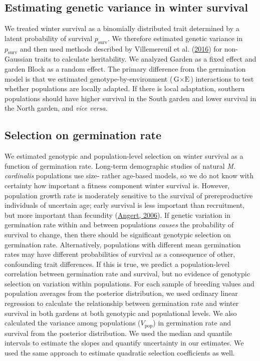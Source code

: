 \documentclass[
  12pt,
]{article}
\begin{document}
\hypertarget{estimating-genetic-variance-in-winter-survival}{%
\subsection{Estimating genetic variance in winter survival}\label{estimating-genetic-variance-in-winter-survival}}

We treated winter survival as a binomially distributed trait determined by a latent probability of survival \(p_\text{surv}\). We therefore estimated genetic variance in \(p_\text{surv}\) and then used methods described by Villemereuil et al. (\protect\hyperlink{ref-de_villemereuil_general_2016}{2016}) for non-Gaussian traits to calculate heritability. We analyzed Garden as a fixed effect and garden Block as a random effect. The primary difference from the germination model is that we estimated genotype-by-environment (\(\text{G}\times\text{E}\)) interactions to test whether populations are locally adapted. If there is local adaptation, southern populations should have higher survival in the South garden and lower survival in the North garden, and \emph{vice versa}.

\hypertarget{selection-on-germination-rate}{%
\subsection{Selection on germination rate}\label{selection-on-germination-rate}}

We estimated genotypic and population-level selection on winter survival as a function of germination rate. Long-term demographic studies of natural \emph{M. cardinalis} populations use size- rather age-based models, so we do not know with certainty how important a fitness component winter survival is. However, population growth rate is moderately sensitive to the survival of prereproductive individuals of uncertain age; early survival is less important than recruitment, but more important than fecundity (\protect\hyperlink{ref-angert_demography_2006}{Angert, 2006}). If genetic variation in germination rate within and between populations \emph{causes} the probability of survival to change, then there should be significant genotypic selection on germination rate. Alternatively, populations with different mean germination rates may have different probabilities of survival as a consequence of other, confounding trait differences. If this is true, we predict a population-level correlation between germination rate and survival, but no evidence of genotypic selection on variation within populations. For each sample of breeding values and population averages from the posterior distribution, we used ordinary linear regression to calculate the relationship between germination rate and winter survival in both gardens at both genotypic and populational levels. We also calculated the variance among populations (\(V_\text{pop}\)) in germination rate and survival from the posterior distribution. We used the median and quantile intervals to estimate the slopes and quantify uncertainty in our estimates. We used the same approach to estimate quadratic selection coefficients as well.
\end{document}
